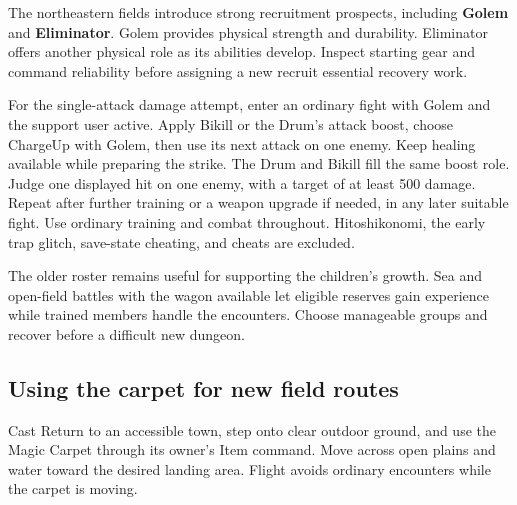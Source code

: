 The northeastern fields introduce strong recruitment prospects,
including \textbf{Golem} and \textbf{Eliminator}. Golem provides
physical strength and durability. Eliminator offers another physical
role as its abilities develop. Inspect starting gear and command
reliability before assigning a new recruit essential recovery work.


For the single-attack damage attempt, enter an ordinary fight with
Golem and the support user active. Apply Bikill or the Drum's attack
boost, choose ChargeUp with Golem, then use its next attack on one
enemy. Keep healing available while preparing the strike. The Drum
and Bikill fill the same boost role. Judge one displayed hit on one
enemy, with a target of at least 500 damage. Repeat after further
training or a weapon upgrade if needed, in any later suitable fight.
Use ordinary training and combat throughout. Hitoshikonomi, the early
trap glitch, save-state cheating, and cheats are excluded.


The older roster remains useful for supporting the children's growth.
Sea and open-field battles with the wagon available let eligible
reserves gain experience while trained members handle the encounters.
Choose manageable groups and recover before a difficult new dungeon.

\subsection*{Using the carpet for new field routes}

Cast Return to an accessible town, step onto clear outdoor ground,
and use the Magic Carpet through its owner's Item command.
Move across open plains and water toward the desired landing area.
Flight avoids ordinary encounters while the carpet is moving.

